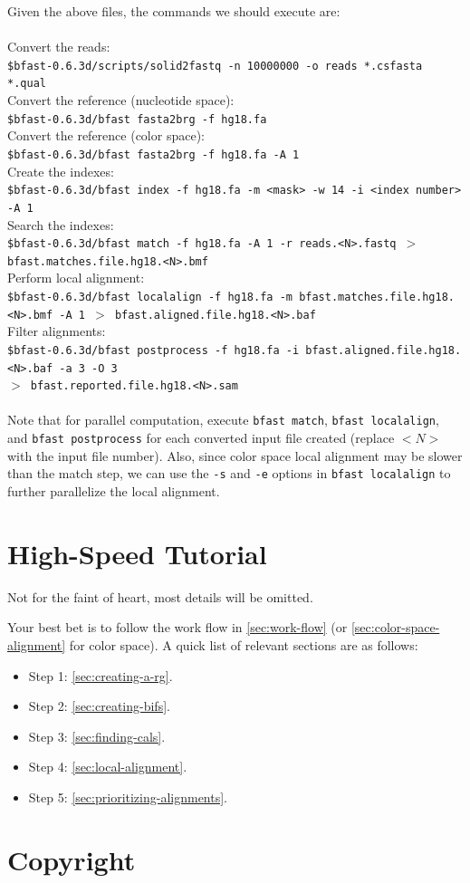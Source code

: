 \documentclass[a4paper,12pt]{book}
\newcommand{\Version}{0.6.3d}
\newcommand{\TT}[1]{{\tt #1}} %
\begin{document}
Given the above files, the commands we should execute are:
\\\\
Convert the reads:\\
{\tt \scriptsize \$bfast-\Version{}/scripts/solid2fastq -n 10000000 -o reads *.csfasta *.qual\\}
Convert the reference (nucleotide space):\\
{\tt \scriptsize \$bfast-\Version{}/bfast fasta2brg -f hg18.fa\\}
Convert the reference (color space):\\
{\tt \scriptsize \$bfast-\Version{}/bfast fasta2brg -f hg18.fa -A 1 \\}
Create the indexes:\\
{\tt \scriptsize \$bfast-\Version{}/bfast index -f hg18.fa -m <mask> -w 14 -i <index number> -A 1\\}
Search the indexes:\\
{\tt \scriptsize \$bfast-\Version{}/bfast match -f hg18.fa -A 1 -r reads.<N>.fastq $>$ bfast.matches.file.hg18.<N>.bmf\\}
Perform local alignment:\\
{\tt \scriptsize \$bfast-\Version{}/bfast localalign -f hg18.fa -m bfast.matches.file.hg18.<N>.bmf -A 1 $>$ bfast.aligned.file.hg18.<N>.baf\\}
Filter alignments:\\
{\tt \scriptsize \$bfast-\Version{}/bfast postprocess -f hg18.fa -i bfast.aligned.file.hg18.<N>.baf -a 3 -O 3\\
$>$ bfast.reported.file.hg18.<N>.sam\\}
\\
Note that for parallel computation, execute {\tt bfast match}, {\tt bfast localalign}, and {\tt bfast postprocess} for each converted input file created (replace $<N>$ with the input file number).
Also, since color space local alignment may be slower than the match step, we can use the \TT{-s} and \TT{-e} options in {\tt bfast localalign} to further parallelize the local alignment.

\section{High-Speed Tutorial}
\label{sec:high-speed-tutorial}
Not for the faint of heart, most details will be omitted.

Your best bet is to follow the work flow in \autoref{sec:work-flow} (or \autoref{sec:color-space-alignment} for color space).
A quick list of relevant sections are as follows:
\begin{itemize}
	\item Step 1: \autoref{sec:creating-a-rg}.
	\item Step 2: \autoref{sec:creating-bifs}.
	\item Step 3: \autoref{sec:finding-cals}.
	\item Step 4: \autoref{sec:local-alignment}.
	\item Step 5: \autoref{sec:prioritizing-alignments}.
\end{itemize}
\section{Copyright}


{}


\end{document}
